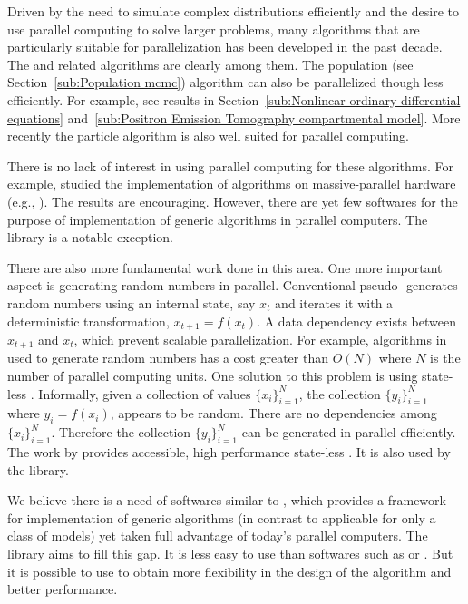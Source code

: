 Driven by the need to simulate complex distributions efficiently and the
desire to use parallel computing to solve larger problems, many algorithms
that are particularly suitable for parallelization has been developed in the
past decade. The \smc and related algorithms are clearly among them. The
population \mcmc (see Section~\ref{sub:Population mcmc}) algorithm can also be
parallelized though less efficiently. For example, see results in
Section~\ref{sub:Nonlinear ordinary differential equations}
and~\ref{sub:Positron Emission Tomography compartmental model}. More recently
the particle \mcmc algorithm \cite{Andrieu:2010gc} is also well suited for
parallel computing.

There is no lack of interest in using parallel computing for these algorithms.
For example, \cite{Lee:2010fm} studied the implementation of \smc algorithms
on massive-parallel hardware (e.g., \gpu). The results are encouraging.
However, there are yet few softwares for the purpose of implementation of
generic \smc algorithms in parallel computers. The \libbi library is a notable
exception.

There are also more fundamental work done in this area. One more important
aspect is generating random numbers in parallel. Conventional pseudo-\rng
generates random numbers using an internal state, say $x_t$ and iterates it
with a deterministic transformation, $x_{t+1} = f(x_t)$. A data dependency
exists between $x_{t+1}$ and $x_t$, which prevent scalable parallelization.
For example, algorithms in \cite{Lee:2010fm} used to generate random numbers
has a cost greater than $O(N)$ where $N$ is the number of parallel computing
units. One solution to this problem is using state-less \rng. Informally,
given a collection of values $\{x_i\}_{i=1}^N$, the collection
$\{y_i\}_{i=1}^N$ where $y_i = f(x_i)$, appears to be random. There are no
dependencies among $\{x_i\}_{i=1}^N$. Therefore the collection
$\{y_i\}_{i=1}^N$ can be generated in parallel efficiently. The work by
\cite{Salmon:2011um} provides accessible, high performance state-less \rng. It
is also used by the \vsmc library.

We believe there is a need of softwares similar to \smctc, which provides a
framework for implementation of generic \smc algorithms (in contrast to
applicable for only a class of models) yet taken full advantage of today's
parallel computers. The \vsmc library aims to fill this gap. It is less easy
to use than softwares such as \libbi or \biips. But it is possible to use to
obtain more flexibility in the design of the algorithm and better performance.

